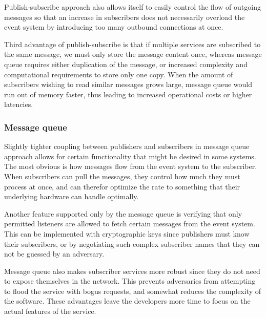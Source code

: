\documentclass[conference]{IEEEtran}
\begin{document}
Publish-subscribe approach also allows itself to easily control the flow of outgoing messages so that an increase in subscribers does not necessarily overload the event system by introducing too many outbound connections at once.

Third advantage of publish-subscribe is that if multiple services are subscribed to the same message, we must only store the message content once, whereas message queue requires either duplication of the message, or increased complexity and computational requirements to store only one copy. When the amount of subscribers wishing to read similar messages grows large, message queue would run out of memory faster, thus leading to increased operational costs or higher latencies.
\\

\subsubsection{Message queue}
Slightly tighter coupling between publishers and subscribers in message queue approach allows for certain functionality that might be desired in some systems. The most obvious is how messages flow from the event system to the subscriber. When subscribers can pull the messages, they control how much they must process at once, and can therefor optimize the rate to something that their underlying hardware can handle optimally.

Another feature supported only by the message queue is verifying that only permitted listeners are allowed to fetch certain messages from the event system. This can be implemented with cryptographic keys since publishers must know their subscribers, or by negotiating such complex subscriber names that they can not be guessed by an adversary.

Message queue also makes subscriber services more robust since they do not need to expose themselves in the network. This prevents adversaries from attempting to flood the service with bogus requests, and somewhat reduces the complexity of the software. These advantages leave the developers more time to focus on the actual features of the service.
\\
\end{document}
